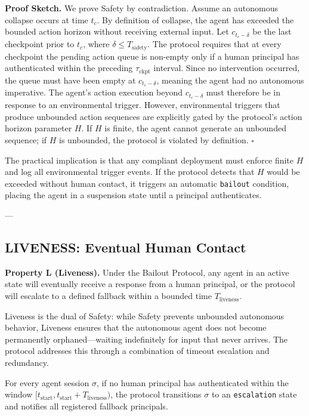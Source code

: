 \textbf{Proof Sketch.} We prove Safety by contradiction. Assume an autonomous collapse occurs at time $t_c$. By definition of collapse, the agent has exceeded the bounded action horizon without receiving external input. Let $c_{t_c - \delta}$ be the last checkpoint prior to $t_c$, where $\delta \leq T_{\text{safety}}$. The protocol requires that at every checkpoint the pending action queue is non-empty only if a human principal has authenticated within the preceding $\tau_{\text{ckpt}}$ interval. Since no intervention occurred, the queue must have been empty at $c_{t_c - \delta}$, meaning the agent had no autonomous imperative. The agent's action execution beyond $c_{t_c - \delta}$ must therefore be in response to an environmental trigger. However, environmental triggers that produce unbounded action sequences are explicitly gated by the protocol's action horizon parameter $H$. If $H$ is finite, the agent cannot generate an unbounded sequence; if $H$ is unbounded, the protocol is violated by definition. $\square$

The practical implication is that any compliant deployment must enforce finite $H$ and log all environmental trigger events. If the protocol detects that $H$ would be exceeded without human contact, it triggers an automatic \texttt{bailout} condition, placing the agent in a suspension state until a principal authenticates.

---

\subsection{LIVENESS: Eventual Human Contact}

\textbf{Property L (Liveness).} Under the Bailout Protocol, any agent in an active state will eventually receive a response from a human principal, or the protocol will escalate to a defined fallback within a bounded time $T_{\text{liveness}}$.

Liveness is the dual of Safety: while Safety prevents unbounded autonomous behavior, Liveness ensures that the autonomous agent does not become permanently orphaned—waiting indefinitely for input that never arrives. The protocol addresses this through a combination of timeout escalation and redundancy.

\begin{invariant}
For every agent session $\sigma$, if no human principal has authenticated within the window $[t_{\text{start}}, t_{\text{start}} + T_{\text{liveness}})$, the protocol transitions $\sigma$ to an \texttt{escalation} state and notifies all registered fallback principals.
\end{invariant}

